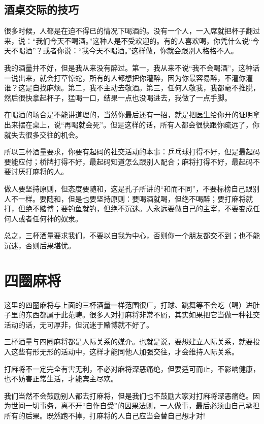 \documentclass[fontset=fandol, a4paper, 12pt, openright]{ctexbook}
\begin{document}
\section{酒桌交际的技巧}

很多时候，人都是在迫不得已的情况下喝酒的。没有一个人，一入席就把杯子翻过来，说：“我们今天不喝酒。”这种人是不受欢迎的。有的人喜欢喝，你凭什么说“今天不喝酒”？或者你说：“我今天不喝酒。”这样做，你就会跟别人格格不入。

我的酒量并不好，但是我从来没有醉过。第一，我从来不说“我不会喝酒”，这种话一说出来，就会打草惊蛇，所有的人都想把你灌醉，因为你最容易醉，不灌你灌谁？这是自找麻烦。第二，我不主动去敬酒。第三，任何人敬我，我都毫不推脱，然后很快拿起杯子，猛喝一口，结果一点也没喝进去，我做了一点手脚。

在喝酒的场合是不能讲道理的，当然你最后还有一招，就是把医生给你开的证明拿出来摆在桌上，说“再喝就会死”。但是这样的话，所有人都会很快跟你疏远了，你就失去很多交往的机会。

所以三杯酒量要求，你要有起码的社交活动的本事：乒乓球打得不好，但是最起码要能应付；桥牌打得不好，最起码知道怎么跟别人配合；麻将打得不好，最起码不要讨厌打麻将的人。

做人要坚持原则，但态度要随和，这是孔子所讲的“和而不同”，不要标榜自己跟别人不一样。要随和，但是也要坚持原则：要喝酒就喝，但绝不喝醉；要打麻将就打，但绝不赌博；要钓鱼就钓，但绝不沉迷。人永远要做自己的主宰，不要变成任何人或者任何神的奴隶。

总之，三杯酒量要求我们，不要以自我为中心，否则你一个朋友都交不到；也不能沉迷，否则后果堪忧。


\chapter{四圈麻将}
这里的四圈麻将与上面的三杯酒量一样范围很广，打球、跳舞等不会吃（喝）进肚子里的东西都属于此范畴。很多人对打麻将非常不屑，其实如果把它当做一种社交活动的话，无可厚非，但沉迷于赌博就不好了。

三杯酒量与四圈麻将都是人际关系的媒介。也就是说，要想建立人际关系，就要投入这些有形无形的活动中，这样才能同他人加强交往，才会维持人际关系。

打麻将不一定完全有害无利，不必对麻将深恶痛绝，但要适可而止，不影响健康，也不妨害正常生活，才能宾主尽欢。

我们当然不会鼓励别人都去打麻将，但是我们也不鼓励大家对打麻将深恶痛绝。因为世间一切事务，离不开“自作自受”的因果法则，一人做事，最后必须由自己承担所有的后果。既然跑不掉，打麻将的人自己应当会替自己想才对!
\end{document}
